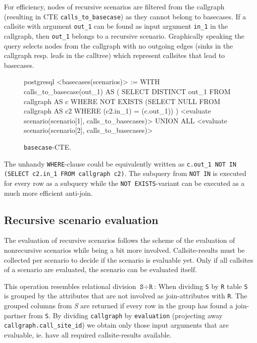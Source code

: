 For efficiency, nodes of recursive scenarios are filtered from the callgraph (resulting in CTE \texttt{calls\_to\_basecase}) as they cannot belong to basecases. If a callsite with argument \texttt{out\_1} can be found as input argument \texttt{in\_1} in the callgraph, then \texttt{out\_1} belongs to a recursive scenario. Graphically speaking the query selects nodes from the callgraph with no outgoing edges (sinks in the callgraph resp. leafs in the calltree) which represent callsites that lead to basecases.

\begin{figure}[h!]
    \centering
    \begin{cminted}{postgresql}
<basecases(scenarios)> := 
   WITH calls_to_basecase(out_1) AS (
       SELECT DISTINCT out_1 
       FROM callgraph AS c
       WHERE NOT EXISTS (SELECT NULL FROM callgraph AS c2 WHERE (c2.in_1) = (c.out_1))
   )
   <evaluate scenario(scenario[1], calls_to_basecases)>
     UNION ALL 
   <evaluate scenario(scenario[2], calls_to_basecases)>
    \end{cminted}
    \caption{\texttt{basecase}-CTE.}
    \label{macro:basecases}
\end{figure}

The unhandy \texttt{WHERE}-clause could be equivalently written as \texttt{c.out_1 NOT IN (SELECT c2.in_1 FROM callgraph c2)}. %
The subquery from \texttt{NOT IN} is executed for every row as a subquery while the \texttt{NOT EXISTS}-variant can be executed as a much more efficient anti-join.

\subsection{Recursive scenario evaluation}

The evaluation of recursive scenarios follows the scheme of the evaluation of nonrecursive scenarios while being a bit more involved. Callsite-results must be collected per scenario to decide if the scenario is evaluable yet. Only if all callsites of a scenario are evaluated, the scenario can be evaluated itself.

This operation resembles relational division $\texttt{S} \div \texttt{R}$: When dividing \texttt{S} by \texttt{R} table \texttt{S} is grouped by the attributes that are not involved as join-attributes with \texttt{R}. The grouped columns from \textit{S} are returned if every row in the group has found a join-partner from \texttt{S}. By dividing \texttt{callgraph} by \texttt{evaluation} (projecting away \texttt{callgraph.call\_site\_id}) we obtain only those input arguments that are evaluable, ie. have all required callsite-results available.

